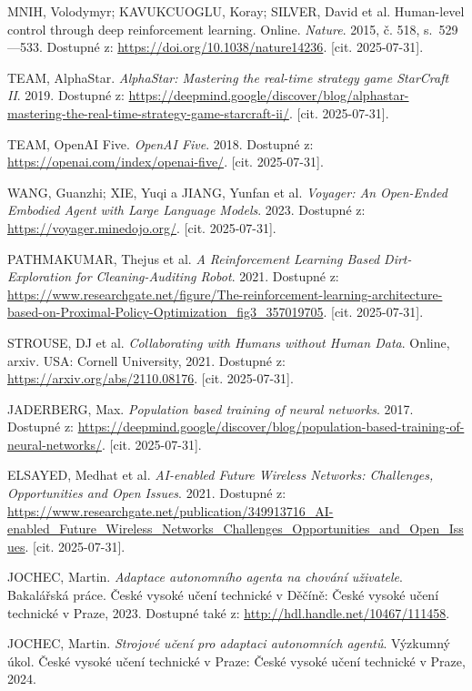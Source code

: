 MNIH, Volodymyr; KAVUKCUOGLU, Koray; SILVER, David et al. Human-level control through deep reinforcement learning. Online. \textit{Nature}. 2015, č. 518, s.~529---533. Dostupné z: \url{https://doi.org/10.1038/nature14236}. [cit. 2025-07-31].

TEAM, AlphaStar. \textit{AlphaStar: Mastering the real-time strategy game StarCraft II}. 2019. Dostupné z: \url{https://deepmind.google/discover/blog/alphastar-mastering-the-real-time-strategy-game-starcraft-ii/}. [cit. 2025-07-31].

TEAM, OpenAI Five. \textit{OpenAI Five}. 2018. Dostupné z: \url{https://openai.com/index/openai-five/}. [cit. 2025-07-31].

WANG, Guanzhi; XIE, Yuqi a JIANG, Yunfan et al. \textit{Voyager: An Open-Ended Embodied Agent with Large Language Models}. 2023. Dostupné z: \url{https://voyager.minedojo.org/}. [cit. 2025-07-31].

PATHMAKUMAR, Thejus et al. \textit{A Reinforcement Learning Based Dirt-Exploration for Cleaning-Auditing Robot}. 2021. Dostupné z: \url{https://www.researchgate.net/figure/The-reinforcement-learning-architecture-based-on-Proximal-Policy-Optimization_fig3_357019705}. [cit. 2025-07-31].

STROUSE, DJ et al. \textit{Collaborating with Humans without Human Data}. Online, arxiv. USA: Cornell University, 2021. Dostupné z: \url{https://arxiv.org/abs/2110.08176}. [cit. 2025-07-31].

JADERBERG, Max. \textit{Population based training of neural networks}. 2017. Dostupné z: \url{https://deepmind.google/discover/blog/population-based-training-of-neural-networks/}. [cit. 2025-07-31].

ELSAYED, Medhat et al. \textit{AI-enabled Future Wireless Networks: Challenges, Opportunities and Open Issues}. 2021. Dostupné z: \url{https://www.researchgate.net/publication/349913716_AI-enabled_Future_Wireless_Networks_Challenges_Opportunities_and_Open_Issues}. [cit. 2025-07-31].

JOCHEC, Martin. \textit{Adaptace autonomního agenta na chování uživatele}. Bakalářská práce. České vysoké učení technické v Děčíně: České vysoké učení technické v Praze, 2023. Dostupné také z: \url{http://hdl.handle.net/10467/111458}.

JOCHEC, Martin. \textit{Strojové učení pro adaptaci autonomních agentů}. Výzkumný úkol. České vysoké učení technické v Praze: České vysoké učení technické v Praze, 2024.